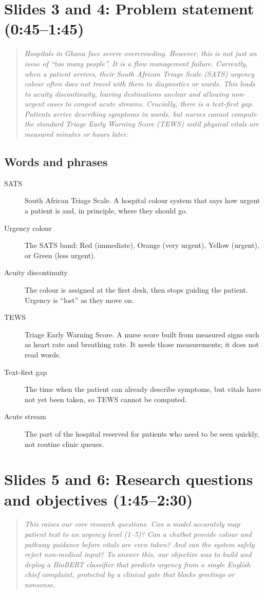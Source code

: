 \documentclass[11pt,a4paper]{article}
\newcommand{\say}[1]{\begin{quote}\itshape #1\end{quote}}
\newcommand{\terms}{\subsection*{Words and phrases}}
\begin{document}
\section{Slides 3 and 4: Problem statement (0:45--1:45)}

\say{Hospitals in Ghana face severe overcrowding. However, this is not just an issue of ``too many people''. It is a flow management failure. Currently, when a patient arrives, their South African Triage Scale (SATS) urgency colour often does not travel with them to diagnostics or wards. This leads to acuity discontinuity, leaving destinations unclear and allowing non-urgent cases to congest acute streams. Crucially, there is a text-first gap. Patients arrive describing symptoms in words, but nurses cannot compute the standard Triage Early Warning Score (TEWS) until physical vitals are measured minutes or hours later.}

\terms
\begin{description}
\item[SATS] South African Triage Scale. A hospital colour system that says how urgent a patient is and, in principle, where they should go.
\item[Urgency colour] The SATS band: Red (immediate), Orange (very urgent), Yellow (urgent), or Green (less urgent).
\item[Acuity discontinuity] The colour is assigned at the first desk, then stops guiding the patient. Urgency is ``lost'' as they move on.
\item[TEWS] Triage Early Warning Score. A nurse score built from measured signs such as heart rate and breathing rate. It needs those measurements; it does not read words.
\item[Text-first gap] The time when the patient can already describe symptoms, but vitals have not yet been taken, so TEWS cannot be computed.
\item[Acute stream] The part of the hospital reserved for patients who need to be seen quickly, not routine clinic queues.
\end{description}

\section{Slides 5 and 6: Research questions and objectives (1:45--2:30)}

\say{This raises our core research questions. Can a model accurately map patient text to an urgency level (1--5)? Can a chatbot provide colour and pathway guidance before vitals are even taken? And can the system safely reject non-medical input? To answer this, our objective was to build and deploy a BioBERT classifier that predicts urgency from a single English chief complaint, protected by a clinical gate that blocks greetings or nonsense.}
\end{document}
